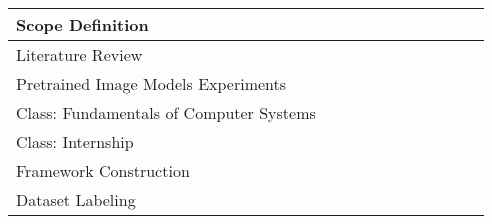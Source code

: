 \begin{table}[ht]
\begin{tabular}{lllllllllll}
Scope Definition                                      &                          &                          &                          & \cellcolor[HTML]{FFCCC9} &                          &                          &                          &                                              &                                              &                          \\ \hline
Literature Review                                     &                          &                          &                          &                          & \cellcolor[HTML]{96FFFB} &                          &                          &                                              &                                              &                          \\ \hline
Pretrained Image Models Experiments                   &                          &                          &                          &                          & \cellcolor[HTML]{96FFFB} &                          &                          &                                              &                                              &                          \\ \hline
Class: Fundamentals of Computer Systems               &                          &                          &                          &                          & \cellcolor[HTML]{9AFF99} & \cellcolor[HTML]{9AFF99} &                          &                                              &                                              &                          \\ \hline
Class: Internship                                     &                          &                          &                          &                          & \cellcolor[HTML]{9AFF99} & \cellcolor[HTML]{9AFF99} &                          &                                              &                                              &                          \\ \hline
Framework Construction                                &                          &                          &                          &                          & \cellcolor[HTML]{96FFFB} & \cellcolor[HTML]{96FFFB} &                          &                                              &                                              &                          \\ \hline
Dataset Labeling                                      &                          &                          &                          &                          &                          & \cellcolor[HTML]{96FFFB} &                          &                                              &                                              &                          \\ \hline

\end{tabular}
\end{table}
